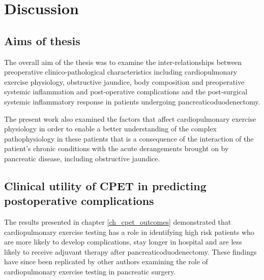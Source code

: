 
\chapter{Discussion}
\label{ch_discussion}


\clearpage
\section{Aims of thesis}

The overall aim of the thesis was to examine the inter-relationships between preoperative clinico-pathological characteristics including cardiopulmonary exercise physiology, obstructive jaundice, body composition and preoperative systemic inflammation and post-operative complications and the post-surgical systemic inflammatory response in patients undergoing pancreaticoduodenectomy.

The present work also examined the factors that affect cardiopulmonary exercise physiology in order to enable a better understanding of the complex pathophysiology in these patients that is a consequence of the interaction of the patient's chronic conditions with the acute derangements brought on by pancreatic disease, including obstructive jaundice.

\section{Clinical utility of CPET in predicting postoperative complications}
The results presented in chapter \ref{ch_cpet_outcomes} demonstrated that cardiopulmonary exercise testing has a role in identifying high risk patients who are more likely to develop complications, stay longer in hospital and are less likely to receive adjuvant therapy after pancreaticoduodenectomy. 
These findings have since been replicated by other authors examining the role of cardiopulmonary exercise testing in pancreatic surgery. 

